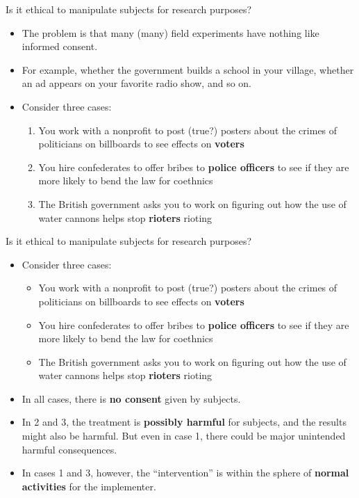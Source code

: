 \documentclass[
  11pt,
  ignorenonframetext,
]{beamer}
\providecommand{\tightlist}{%
  \setlength{\itemsep}{0pt}\setlength{\parskip}{0pt}}\usepackage{longtable,booktabs,array}
\begin{document}
\begin{frame}{Is it ethical to manipulate subjects for research
purposes?}
\protect\hypertarget{is-it-ethical-to-manipulate-subjects-for-research-purposes}{}
\begin{itemize}
\item
  The problem is that many (many) field experiments have nothing like
  informed consent.
\item
  For example, whether the government builds a school in your village,
  whether an ad appears on your favorite radio show, and so on.
\item
  Consider three cases:

  \begin{enumerate}
  \tightlist
  \item
    You work with a nonprofit to post (true?) posters about the crimes
    of politicians on billboards to see effects on \textbf{voters}
  \item
    You hire confederates to offer bribes to \textbf{police officers} to
    see if they are more likely to bend the law for coethnics
  \item
    The British government asks you to work on figuring out how the use
    of water cannons helps stop \textbf{rioters} rioting
  \end{enumerate}
\end{itemize}
\end{frame}

\begin{frame}{Is it ethical to manipulate subjects for research
purposes?}
\protect\hypertarget{is-it-ethical-to-manipulate-subjects-for-research-purposes-1}{}
\begin{itemize}
\item
  Consider three cases:

  \begin{itemize}
  \tightlist
  \item
    You work with a nonprofit to post (true?) posters about the crimes
    of politicians on billboards to see effects on \textbf{voters}
  \item
    You hire confederates to offer bribes to \textbf{police officers} to
    see if they are more likely to bend the law for coethnics
  \item
    The British government asks you to work on figuring out how the use
    of water cannons helps stop \textbf{rioters} rioting
  \end{itemize}
\item
  In all cases, there is \textbf{no consent} given by subjects.
\item
  In 2 and 3, the treatment is \textbf{possibly harmful} for subjects,
  and the results might also be harmful. But even in case 1, there could
  be major unintended harmful consequences.
\item
  In cases 1 and 3, however, the ``intervention'' is within the sphere
  of \textbf{normal activities} for the implementer.
\end{itemize}
\end{frame}
\end{document}

